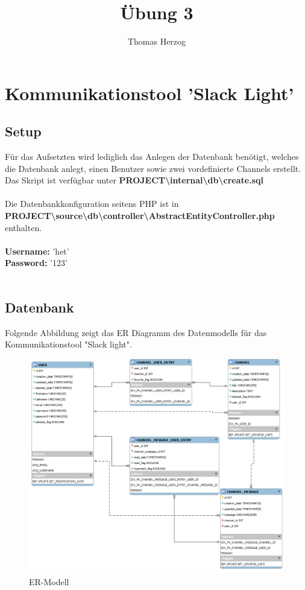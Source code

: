 \documentclass[11pt, a4paper, twoside]{article}   	%
\title{Übung 3}
\author{Thomas Herzog}
\begin{document}
\setlength{\headheight}{15mm}

{\color{myred}
	\section
		{Kommunikationstool 'Slack Light'}
}

\subsection{Setup}
Für das Aufsetzten wird lediglich das Anlegen der Datenbank benötigt, welches die Datenbank anlegt, einen Benutzer sowie zwei vordefinierte Channels erstellt.\\
Das Skript ist verfügbar unter \textbf{PROJECT\textbackslash internal\textbackslash db\textbackslash create.sql}\\\\
Die Datenbankkonfiguration seitens PHP ist in\\
\textbf{PROJECT\textbackslash source\textbackslash db\textbackslash controller\textbackslash AbstractEntityController.php}\\
enthalten.\\\\
\textbf {Username:} 'het'\\
\textbf {Password:} '123'\\\\
\newpage 

\subsection{Datenbank}
Folgende Abbildung zeigt das ER Diagramm des Datenmodells für das Kommunikationstool "Slack light". \
\begin{figure}[h]
	\centering
	\includegraphics[scale=0.5]{images/er-model.PNG}
	\caption
	{ER-Modell}
\end{figure}
\end{document}
